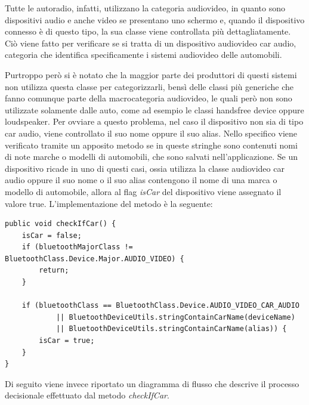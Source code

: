 Tutte le autoradio, infatti, utilizzano la categoria audiovideo, in quanto sono dispositivi audio e anche video se presentano uno schermo e, quando il dispositivo connesso è di questo tipo, la sua classe viene controllata più dettagliatamente. Ciò viene fatto per verificare se si tratta di un dispositivo audiovideo car audio, categoria che identifica specificamente i sistemi audiovideo delle automobili.

Purtroppo però si è notato che la maggior parte dei produttori di questi sistemi non utilizza questa classe per categorizzarli, bensì delle classi più generiche che fanno comunque parte della macrocategoria audiovideo, le quali però non sono utilizzate solamente dalle auto, come ad esempio le classi handsfree device oppure loudspeaker. Per ovviare a questo problema, nel caso il dispositivo non sia di tipo car audio, viene controllato il suo nome oppure il suo alias. Nello specifico viene verificato tramite un apposito metodo se in queste stringhe sono contenuti nomi di note marche o modelli di automobili, che sono salvati nell'applicazione. Se un dispositivo ricade in uno di questi casi, ossia utilizza la classe audiovideo car audio oppure il suo nome o il suo alias contengono il nome di una marca o modello di automobile, allora al flag \textit{isCar} del dispositivo viene assegnato il valore true. L'implementazione del metodo è la seguente:
\begin{verbatim}
public void checkIfCar() {
    isCar = false;
    if (bluetoothMajorClass != BluetoothClass.Device.Major.AUDIO_VIDEO) {
        return;
    }

    if (bluetoothClass == BluetoothClass.Device.AUDIO_VIDEO_CAR_AUDIO
            || BluetoothDeviceUtils.stringContainCarName(deviceName)
            || BluetoothDeviceUtils.stringContainCarName(alias)) {
        isCar = true;
    }
}
\end{verbatim}
Di seguito viene invece riportato un diagramma di flusso che descrive il processo decisionale effettuato dal metodo \textit{checkIfCar}.

